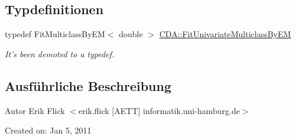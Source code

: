 \subsection*{Typdefinitionen}
\begin{DoxyCompactItemize}
\item 
\hypertarget{namespaceCDA_ae4a2bfc00d6744ed70526c4cb184ab09}{
typedef FitMulticlassByEM$<$ double $>$ \hyperlink{namespaceCDA_ae4a2bfc00d6744ed70526c4cb184ab09}{CDA::FitUnivariateMulticlassByEM}}
\label{namespaceCDA_ae4a2bfc00d6744ed70526c4cb184ab09}

\begin{DoxyCompactList}\small\item\em It's been demoted to a typedef. \item\end{DoxyCompactList}\end{DoxyCompactItemize}


\subsection{Ausführliche Beschreibung}
\begin{DoxyAuthor}{Autor}
Erik Flick $<$erik.flick \mbox{[}AETT\mbox{]} informatik.uni-\/hamburg.de$>$
\end{DoxyAuthor}
Created on: Jan 5, 2011 